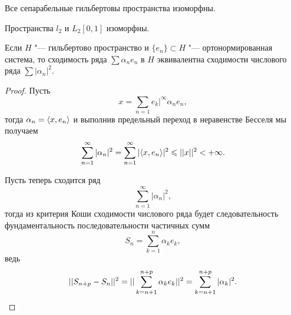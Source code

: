 \documentclass[main]{subfiles}
\begin{document}
\begin{theorem*}
  Все сепарабельные гильбертовы пространства изоморфны.
\end{theorem*}

\begin{theorem*}
  Пространства \( l_2 \) и \( L_2[0, 1] \) изоморфны.
\end{theorem*}

\begin{theorem*}
  Если \( H \) "--- гильбертово пространство и
  \( \{ e_n \} \subset H  \) "---
  ортонормированная система,
  то сходимость ряда \( \sum \alpha_n e_n \) в \( H \)
  эквивалентна сходимости числового ряда \( \sum |\alpha_n|^2 \).
\end{theorem*}
\begin{proof}
  Пусть
  \[ x = \sum_{n = 1} e_k|^\infty \alpha_n e_n, \]
  тогда \( \alpha_n = \langle x, e_n \rangle \) и выполнив
  предельный переход в неравенстве Бесселя мы
  получаем
  \[
    \sum_{n = 1}^\infty |\alpha_n|^2 =
    \sum_{n = 1}^\infty |\langle x, e_n \rangle|^2 \leqslant
    ||x||^2 < +\infty.
  \]

  Пусть теперь сходится ряд
  \[
    \sum_{n=1}^\infty |\alpha_n|^2,
  \]
  тогда из критерия Коши сходимости числового ряда
  будет следовательность фундаментальность
  последовательности частичных сумм
  \[
    S_n = \sum_{k=1}^n \alpha_k e_k,
  \]
  ведь
  \[
    ||S_{n + p} - S_{n}||^2 =
    ||\sum_{k=n+1}^{n+p} \alpha_k e_k||^2 =
    \sum_{k=n+1}^{n+p} |\alpha_k|^2. \qedhere
  \]
\end{proof}
\end{document}
